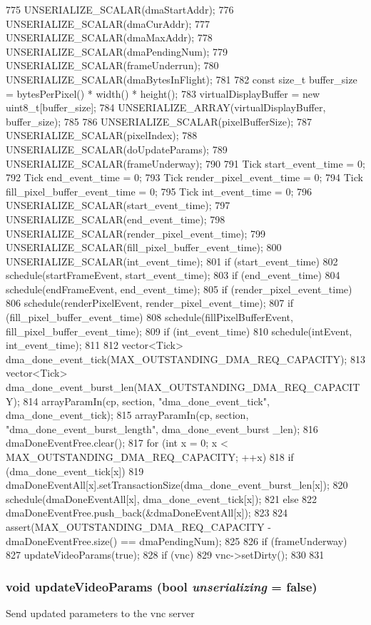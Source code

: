 \begin{DoxyCode}
{775     UNSERIALIZE_SCALAR(dmaStartAddr);
776     UNSERIALIZE_SCALAR(dmaCurAddr);
777     UNSERIALIZE_SCALAR(dmaMaxAddr);
778     UNSERIALIZE_SCALAR(dmaPendingNum);
779     UNSERIALIZE_SCALAR(frameUnderrun);
780     UNSERIALIZE_SCALAR(dmaBytesInFlight);
781 
782     const size_t buffer_size = bytesPerPixel() * width() * height();
783     virtualDisplayBuffer = new uint8_t[buffer_size];
784     UNSERIALIZE_ARRAY(virtualDisplayBuffer, buffer_size);
785 
786     UNSERIALIZE_SCALAR(pixelBufferSize);
787     UNSERIALIZE_SCALAR(pixelIndex);
788     UNSERIALIZE_SCALAR(doUpdateParams);
789     UNSERIALIZE_SCALAR(frameUnderway);
790 
791     Tick start_event_time = 0;
792     Tick end_event_time = 0;
793     Tick render_pixel_event_time = 0;
794     Tick fill_pixel_buffer_event_time = 0;
795     Tick int_event_time = 0;
796     UNSERIALIZE_SCALAR(start_event_time);
797     UNSERIALIZE_SCALAR(end_event_time);
798     UNSERIALIZE_SCALAR(render_pixel_event_time);
799     UNSERIALIZE_SCALAR(fill_pixel_buffer_event_time);
800     UNSERIALIZE_SCALAR(int_event_time);
801     if (start_event_time)
802         schedule(startFrameEvent, start_event_time);
803     if (end_event_time)
804         schedule(endFrameEvent, end_event_time);
805     if (render_pixel_event_time)
806         schedule(renderPixelEvent, render_pixel_event_time);
807     if (fill_pixel_buffer_event_time)
808         schedule(fillPixelBufferEvent, fill_pixel_buffer_event_time);
809     if (int_event_time)
810         schedule(intEvent, int_event_time);
811 
812     vector<Tick> dma_done_event_tick(MAX_OUTSTANDING_DMA_REQ_CAPACITY);
813     vector<Tick> dma_done_event_burst_len(MAX_OUTSTANDING_DMA_REQ_CAPACITY);
814     arrayParamIn(cp, section, "dma_done_event_tick", dma_done_event_tick);
815     arrayParamIn(cp, section, "dma_done_event_burst_length", dma_done_event_burst
      _len);
816     dmaDoneEventFree.clear();
817     for (int x = 0; x < MAX_OUTSTANDING_DMA_REQ_CAPACITY; ++x) {
818         if (dma_done_event_tick[x]) {
819             dmaDoneEventAll[x].setTransactionSize(dma_done_event_burst_len[x]);
820             schedule(dmaDoneEventAll[x], dma_done_event_tick[x]);
821         } else
822             dmaDoneEventFree.push_back(&dmaDoneEventAll[x]);
823     }
824     assert(MAX_OUTSTANDING_DMA_REQ_CAPACITY - dmaDoneEventFree.size() == 
      dmaPendingNum);
825 
826     if (frameUnderway) {
827         updateVideoParams(true);
828         if (vnc)
829             vnc->setDirty();
830     }
831 }
\end{DoxyCode}
\hypertarget{classHDLcd_a0eb6ee93145ff20e40a51ae7b8e4debf}{
\subsubsection[{updateVideoParams}]{\setlength{\rightskip}{0pt plus 5cm}void updateVideoParams (bool {\em unserializing} = {\ttfamily false})}}
\label{classHDLcd_a0eb6ee93145ff20e40a51ae7b8e4debf}
Send updated parameters to the vnc server 


